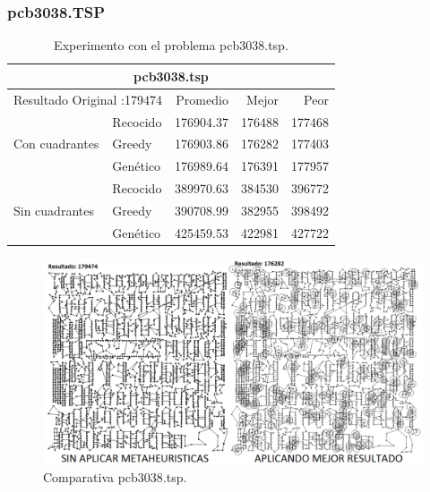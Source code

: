 \subsubsection{pcb3038.TSP}
\begin{table}[hbtp]
 \centering 
    \caption{Experimento con el problema pcb3038.tsp.} 
	\begin{tabular}{ | l   l | r | r | r |   }
        \hline\multicolumn{5}{|c|}{ \rowcolor[gray]{0.8}pcb3038.tsp} \\\hline
        \multicolumn{2}{|l|}{Resultado Original :179474}  & Promedio & Mejor & Peor \\ \hline
                & Recocido  & 176904.37 & 176488 & 177468  \\ 
 Con cuadrantes & Greedy    & \cellcolor[gray]{0.9} 176903.86 & \cellcolor[gray]{0.9} 176282 & \cellcolor[gray]{0.9} 177403  \\ 
                & Genético  & 176989.64 & 176391 & 177957  \\ 
                \hline
                & Recocido  & \cellcolor[gray]{0.9} 389970.63 & 384530 & \cellcolor[gray]{0.9} 396772   \\ 
 Sin cuadrantes & Greedy    & 390708.99 & \cellcolor[gray]{0.9} 382955 & 398492   \\ 
                & Genético  & 425459.53 & 422981 & 427722   \\ 
                \hline
    \end{tabular}
    \label{table:EXP_pcb3038.tsp}
\end{table}
\begin{figure}[hbtp]
    \centering
        \includegraphics[width=1\textwidth]{PruebasResultados/Experimentos_Comparativas/pcb3038.png}
        \caption{Comparativa pcb3038.tsp.}
        \label{fig:pcb3038_comparativa.png}
\end{figure}

